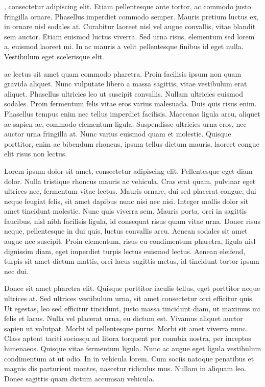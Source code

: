 \documentclass{article}
\begin{document}
\beginnumbering
\autopar

, consectetur adipiscing elit.
 Etiam pellentesque ante tortor, ac commodo justo fringilla ornare.
 Phasellus imperdiet commodo semper.
 Mauris pretium luctus ex, in ornare nisl sodales at.
 Curabitur laoreet nisl vel augue convallis, vitae blandit sem auctor.
 Etiam euismod luctus viverra.
 Sed urna risus, elementum sed lorem a, euismod laoreet mi.
 In ac mauris a velit pellentesque finibus id eget nulla.
 Vestibulum eget scelerisque elit.

  ac lectus sit amet quam commodo pharetra.
 Proin facilisis ipsum non quam gravida aliquet.
 Nunc vulputate libero a massa sagittis, vitae vestibulum erat aliquet.
 Phasellus ultricies leo ut suscipit convallis.
 Nullam ultricies euismod sodales.
 Proin fermentum felis vitae eros varius malesuada.
 Duis quis risus enim.
 Phasellus tempus enim nec tellus imperdiet facilisis.
 Maecenas ligula arcu, aliquet ac sapien ac, commodo elementum ligula.
 Suspendisse ultricies urna eros, nec auctor urna fringilla at.
 Nunc varius euismod quam et molestie.
 Quisque porttitor, enim ac bibendum rhoncus, ipsum tellus dictum mauris, laoreet congue elit risus non lectus.

 
Lorem ipsum dolor sit amet, consectetur adipiscing elit.
 Pellentesque eget diam dolor.
 Nulla tristique rhoncus mauris ac vehicula.
 Cras erat quam, pulvinar eget ultrices nec, fermentum vitae lectus.
 Mauris ornare, dui sed placerat congue, dui neque feugiat felis, sit amet dapibus nunc nisi nec nisi.
 Integer mollis dolor sit amet tincidunt molestie.
 Nunc quis viverra sem.
 Mauris porta, orci in sagittis faucibus, nisl nibh facilisis ligula, id consequat risus quam vitae urna.
 Donec risus neque, pellentesque in dui quis, luctus convallis arcu.
 Aenean sodales sit amet augue nec suscipit.
 Proin elementum, risus eu condimentum pharetra, ligula nisl dignissim diam, eget imperdiet turpis lectus euismod lectus.
 Aenean eleifend, turpis sit amet dictum mattis, orci lacus sagittis metus, id tincidunt tortor ipsum nec dui.

 

Donec sit amet pharetra elit.
 Quisque porttitor iaculis tellus, eget porttitor neque ultrices at.
 Sed ultrices vestibulum urna, sit amet consectetur orci efficitur quis.
 Ut egestas, leo sed efficitur tincidunt, justo massa tincidunt diam, ut maximus mi felis et lacus.
 Nulla vel placerat urna, eu dictum est.
 Vivamus aliquet auctor sapien ut volutpat.
 Morbi id pellentesque purus.
 Morbi sit amet viverra nunc.
 Class aptent taciti sociosqu ad litora torquent per conubia nostra, per inceptos himenaeos.
 Quisque vitae fermentum ligula.
 Nunc ac augue eget ligula vestibulum condimentum at ut odio.
 In in vehicula lorem.
 Cum sociis natoque penatibus et magnis dis parturient montes, nascetur ridiculus mus.
 Nullam in aliquam leo.
 Donec sagittis quam dictum accumsan vehicula.
\end{document}
